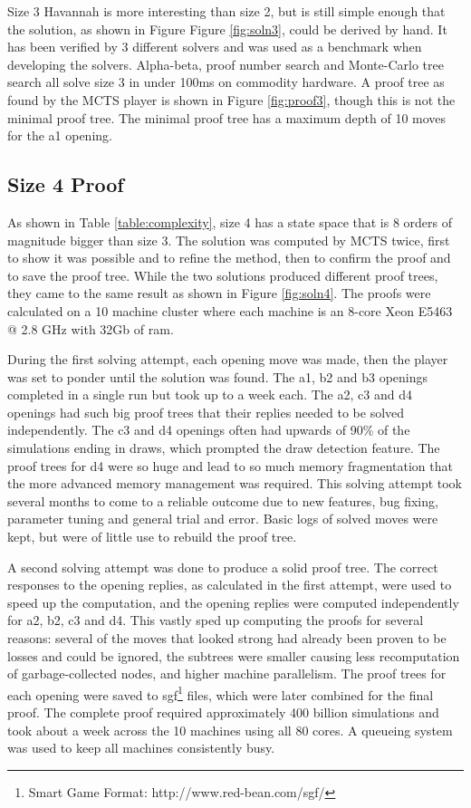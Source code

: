 Size 3 Havannah is more interesting than size 2, but is still simple enough that the solution, as shown in Figure Figure \ref{fig:soln3}, could be derived by hand. It has been verified by 3 different solvers and was used as a benchmark when developing the solvers. Alpha-beta, proof number search and Monte-Carlo tree search all solve size 3 in under 100ms on commodity hardware. A proof tree as found by the MCTS player is shown in Figure \ref{fig:proof3}, though this is not the minimal proof tree. The minimal proof tree has a maximum depth of 10 moves for the a1 opening.


\subsection{Size 4 Proof}

As shown in Table \ref{table:complexity}, size 4  has a state space that is 8 orders of magnitude bigger than size 3. The solution was computed by MCTS twice, first to show it was possible and to refine the method, then to confirm the proof and to save the proof tree. While the two solutions produced different proof trees, they came to the same result as shown in Figure \ref{fig:soln4}. The proofs were calculated on a 10 machine cluster where each machine is an 8-core Xeon E5463 @ 2.8 GHz with 32Gb of ram.

During the first solving attempt, each opening move was made, then the player was set to ponder until the solution was found. The a1, b2 and b3 openings completed in a single run but took up to a week each. The a2, c3 and d4 openings had such big proof trees that their replies needed to be solved independently. The c3 and d4 openings often had upwards of 90\% of the simulations ending in draws, which prompted the draw detection feature. The proof trees for d4 were so huge and lead to so much memory fragmentation that the more advanced memory management was required. This solving attempt took several months to come to a reliable outcome due to new features, bug fixing, parameter tuning and general trial and error. Basic logs of solved moves were kept, but were of little use to rebuild the proof tree.

A second solving attempt was done to produce a solid proof tree. The correct responses to the opening replies, as calculated in the first attempt, were used to speed up the computation, and the opening replies were computed independently for a2, b2, c3 and d4. This vastly sped up computing the proofs for several reasons: several of the moves that looked strong had already been proven to be losses and could be ignored, the subtrees were smaller causing less recomputation of garbage-collected nodes, and higher machine parallelism. The proof trees for each opening were saved to sgf\footnote{Smart Game Format: http://www.red-bean.com/sgf/} files, which were later combined for the final proof. The complete proof required approximately 400 billion simulations and took about a week across the 10 machines using all 80 cores. A queueing system was used to keep all machines consistently busy.

